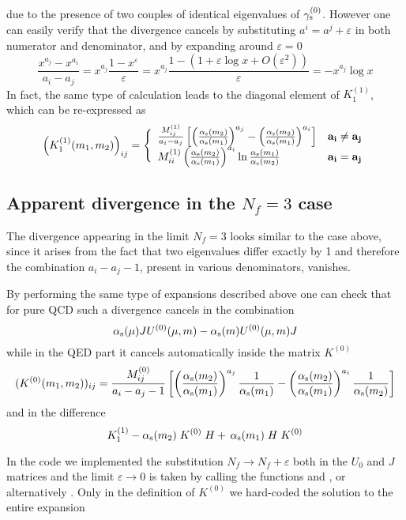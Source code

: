 due to the presence of two couples of identical eigenvalues of $\gamma_{\rm s}^{(0)}$. 
However one can easily verify that the divergence cancels 
by substituting $a^i = a^j + \varepsilon$ in both numerator and denominator, 
and by expanding around $\varepsilon =0$
\begin{equation}
\frac{x^{a_j} - x^{a_i}}{a_i - a_j} = x^{a_j} \frac{1 - x^\varepsilon}{\varepsilon} 
 = x^{a_j} \frac{1 - (1 + \varepsilon \log x + O(\varepsilon^2))}{\varepsilon} = 
- x^{a_j} \log x
\end{equation}
In fact, the same type of calculation leads to the diagonal element of $K_1^{(1)}$,
which can be re-expressed as
\begin{equation}
\left( K_1^{(1)}(m_1,m_2) \right)_{ij} =
\Bigg\lbrace
\begin{array}{ll}
\frac{M^{(1)}_{ij}}{a_i - a_j}
\left[ \left( \frac{\alpha_{\rm s}(m_2)}{\alpha_{\rm s}(m_1)} \right)^{a_j} -
       \left( \frac{\alpha_{\rm s}(m_2)}{\alpha_{\rm s}(m_1)} \right)^{a_i} \right] & \mathbf{a_i \not= a_j} \\
M^{(1)}_{ii} \left( \frac{\alpha_{\rm s}(m_2)}{\alpha_{\rm s}(m_1)} \right)^{a_i}
             \ln\frac{\alpha_{\rm s}(m_1)}{\alpha_{\rm s}(m_2)}             & \mathbf{ a_i=a_j}
\end{array} 
\end{equation}


\subsection{Apparent divergence in the $N_f=3$ case}

The divergence appearing in the limit $N_f=3$ looks similar to the case above, since
it arises from the fact that two eigenvalues differ exactly by 1 and therefore
the combination $a_i -a_j -1$, present in various denominators, vanishes.

By performing the same type of expansions described above one can check that for pure QCD
such a divergence cancels in the combination
\[ \alpha_{\rm s}(\mu) J U^{(0)}(\mu,m) - \alpha_{\rm s}(m) U^{(0)}(\mu,m) J \]
while in the QED part it cancels automatically inside the matrix $K^{(0)}$
\begin{equation}
(K^{(0)}(m_1,m_2))_{ij} = \frac{M^{(0)}_{ij}}{a_i - a_j - 1}
\left[
\left( \frac{\alpha_{\rm s}(m_2)}{\alpha_{\rm s}(m_1)} \right)^{a_j} \frac{1}{\alpha_{\rm s}(m_1)} -
\left( \frac{\alpha_{\rm s}(m_2)}{\alpha_{\rm s}(m_1)} \right)^{a_i} \frac{1}{\alpha_{\rm s}(m_2)}
\right] 
\label{eq:K0}
\end{equation}
and in the difference
\begin{equation}
K_1^{(1)} - \alpha_{\rm s}(m_2) \; K^{(0)} \; H + \,\alpha_{\rm s}(m_1) \; H \; K^{(0)}
\end{equation}

In the code we implemented the substitution $N_f \to N_f + \varepsilon$ both in the 
$U_0$ and $J$ matrices and the limit $\varepsilon \to 0$ is taken by calling the functions 
 and , or alternatively . 
Only in the definition of $K^{(0)}$ we hard-coded the solution to the entire expansion

